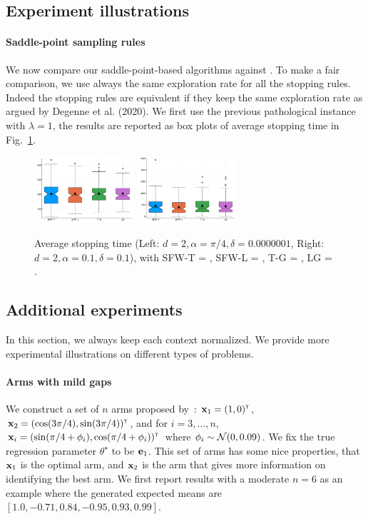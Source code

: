 \subsection{Experiment illustrations}

\paragraph{Saddle-point sampling rules}
We now compare our saddle-point-based algorithms against \LGapE. To make a fair comparison, we use always the same exploration rate for all the stopping rules. Indeed the stopping rules are equivalent if they keep the same exploration rate as argued by Degenne et al. (2020). We first use the previous pathological instance with $\lambda=1$, the results are reported as box plots of average stopping time in Fig.~\ref{fig:exp1}.

\begin{figure}[t!]
    \centering
    \includegraphics[width=0.33\textwidth]{Chapter4/img/exp_sin_-0000001}
    \includegraphics[width=0.33\textwidth]{Chapter4/img/exp_sin_-1}
    \caption{Average stopping time (Left: $d=2,\alpha=\pi/4,\delta=0.0000001$, Right: $d=2,\alpha=0.1,\delta=0.1$), with SFW-T = \SLTCC, SFW-L = \SLGapE, T-G = \LTCC, LG = \LGapE.}
    \label{fig:exp1}
\end{figure}

\subsection{Additional experiments}

In this section, we always keep each context normalized. We provide more experimental illustrations on different types of problems.

\paragraph{Arms with mild gaps}
We construct a set of $n$ arms proposed by~\cite{fiez2019transductive}: ${\bf x}_1=(1,0)^\mathsf{\scriptscriptstyle T}$, ${\bf x}_2=(\cos(3\pi/4),\sin(3\pi/4))^\mathsf{\scriptscriptstyle T}$, and for $i = 3,\ldots,n$, ${\bf x}_i=(\sin(\pi/4+\phi_i),\cos(\pi/4+\phi_i))^\mathsf{\scriptscriptstyle T}$ where $\phi_i\sim\mathcal{N}(0,0.09)$. We fix the true regression parameter $\theta^\star$ to be ${\bf e}_1$. This set of arms has some nice properties, that ${\bf x}_1$ is the optimal arm, and ${\bf x}_2$ is the arm that gives more information on identifying the best arm. We first report results with a moderate $n=6$ as an example where the generated expected means are $[1.0, -0.71, 0.84, -0.95, 0.93, 0.99]$.

